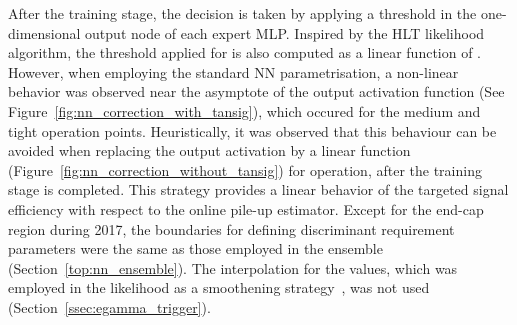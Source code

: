 After the training stage, the decision is taken by applying a threshold in the
one-dimensional output node of each expert MLP.\@ 
Inspired by the HLT likelihood algorithm, the threshold applied for
\rnn is also computed as a linear function of \avgmu{}.
However, when employing the standard NN parametrisation, a non-linear
behavior was observed near the asymptote of the output activation 
function (See Figure~\ref{fig:nn_correction_with_tansig}), which occured
for the medium and tight operation points. Heuristically, it was 
observed that this behaviour can be avoided when replacing the output
activation by a linear function (Figure~\ref{fig:nn_correction_without_tansig})
for operation, after the training stage is completed.
This strategy provides a linear
behavior of the targeted signal efficiency with respect to the online pile-up
estimator. Except for the end-cap region during 2017, the boundaries for
defining discriminant requirement parameters were the same as those employed in
the \rnn ensemble (Section~\ref{top:nn_ensemble}). The 
interpolation for the \et{} values, which was employed in the likelihood as a smoothening strategy~\cite{aaboud2019electron}, was
not used (Section~\ref{ssec:egamma_trigger}).



